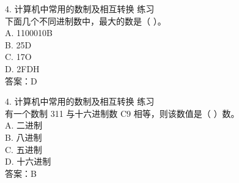 \documentclass[aspectratio=169]{beamer}
\begin{document}
\begin{frame}[t]{4. 计算机中常用的数制及相互转换} \vspace{20pt}
    练习\\
    下面几个不同进制数中，最大的数是（ ）。\\
A. 1100010B\\ B. 25D\\
C. 17O\\ D. 2FDH\\
答案：D\\

\end{frame}



\begin{frame}[t]{4. 计算机中常用的数制及相互转换} \vspace{20pt}
    练习\\
    有一个数制 311 与十六进制数 C9 相等，则该数值是（ ）数。\\
A. 二进制\\ B. 八进制\\
C. 五进制\\ D. 十六进制\\
答案：B\\
\end{frame}
\end{document}
